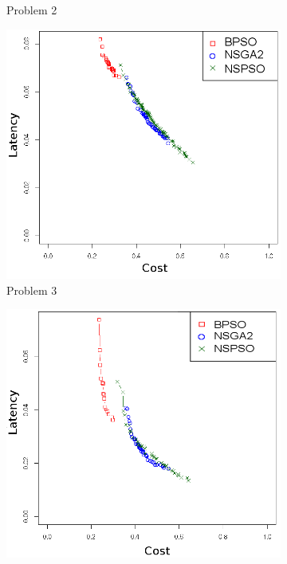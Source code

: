 \begin{figure}[t]
\begin{subfigure}{0.30\textwidth}
	   \caption{Problem 2}
   \end{subfigure}
   \begin{subfigure}{0.30\textwidth}
       \includegraphics[width=\textwidth]{pics/nsgabpso3.png}
	   \caption{Problem 3}
   \end{subfigure}
      \begin{subfigure}{0.30\textwidth}
       \includegraphics[width=\textwidth]{pics/nsgabpso4.png}

\end{subfigure}
\end{figure}
